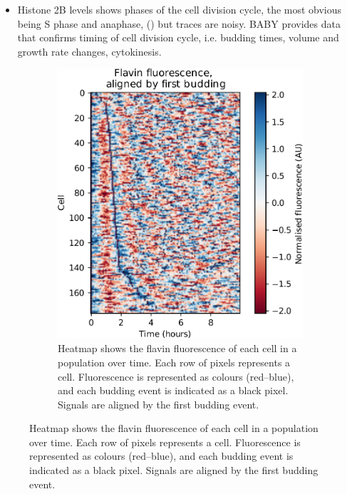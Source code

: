 \begin{itemize}
\item Histone 2B levels shows phases of the cell division cycle, the most obvious being S phase and anaphase, (\textcite{garmendia-torresMultipleInputsEnsure2018}) but traces are noisy.  BABY provides data that confirms timing of cell division cycle, i.e. budding times, volume and growth rate changes, cytokinesis.
\end{itemize}

\begin{figure}
  \centering
  \begin{subfigure}[htpb]{0.4\textwidth}
   \centering
   \includegraphics[width=\textwidth]{heatmap_edit.pdf}
   \caption{
    Heatmap shows the flavin fluorescence of each cell in a population over time.
    Each row of pixels represents a cell.
    Fluorescence is represented as colours (red--blue), and %
    each budding event is indicated as a black pixel.
    Signals are aligned by the first budding event.
   }
   \label{fig:biology-highglc-sync-heatmap}

\end{subfigure}
\end{figure}
